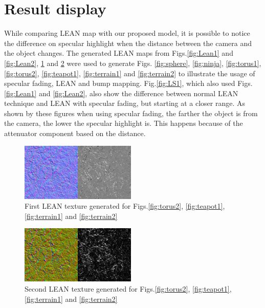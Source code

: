 \documentclass[10pt, conference]{IEEEtran}
\begin{document}
\section{Result display}
\label{sec:results}
%
While comparing LEAN map with our proposed model, it is possible to notice the difference on specular highlight when the distance between the camera and the object changes. The generated LEAN maps from Figs.\ref{fig:Lean1} and \ref{fig:Lean2}, \ref{fig:Lean21} and \ref{fig:Lean22} were used to generate Figs. \ref{fig:sphere}, \ref{fig:ninja}, \ref{fig:torus1}, \ref{fig:torus2}, \ref{fig:teapot1}, \ref{fig:terrain1} and \ref{fig:terrain2} to illustrate the usage of specular fading, LEAN and bump mapping. Fig.\ref{fig:LS1}, which also used Figs.\ref{fig:Lean1} and \ref{fig:Lean2}, also show the difference between normal LEAN technique and LEAN with specular fading, but starting at a closer range. As shown by these figures when using specular fading, the farther the object is from the camera, the lower the specular highlight is. This happens because of the attenuator component based on the distance.
\begin{figure}[here]
	\includegraphics[width=0.49\textwidth]{figs/Lean21.png}
	\caption{First LEAN texture generated for Figs.\ref{fig:torus2}, \ref{fig:teapot1}, \ref{fig:terrain1} and \ref{fig:terrain2}}
	\label{fig:Lean21}
\end{figure}

\begin{figure}[here]
	\includegraphics[width=0.49\textwidth]{figs/Lean22.png}
	\caption{Second LEAN texture generated for Figs.\ref{fig:torus2}, \ref{fig:teapot1}, \ref{fig:terrain1} and \ref{fig:terrain2}}
	\label{fig:Lean22}
\end{figure}
\end{document}
